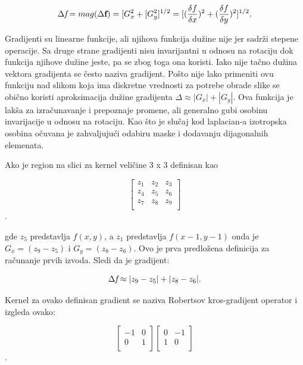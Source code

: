 \documentclass[a4paper,12pt,titlepage]{article}
\begin{document}
\begin{equation}\label{eq:grad12}
	\Delta \emph{f} = mag(\Delta \textbf{f}) = [G_{x}^{2} + [G_{y}^{2}]^{1/2} = [ (\dfrac{\delta f}{\delta x})^{2} +  (\dfrac{\delta f}{\delta y})^{2} ]^{1/2}. 
\end{equation}

Gradijenti su linearne funkcije, ali njihova funkcija dužine nije jer sadrži stepene operacije. Sa druge strane gradijenti nisu invarijantni u odnosu na rotaciju dok funkcija njihove dužine jeste, pa se zbog toga ona koristi. Iako nije tačno dužina vektora gradijenta se često naziva gradijent. Pošto nije lako primeniti ovu funkciju nad slikom koja ima diskretne vrednosti za potrebe obrade slike se obično koristi aproksimacija dužine gradijenta $\Delta \approx |G_{x}| + |G_{y}|$. Ova funkcija je lakša za izračunavanje i prepoznaje promene, ali generalno gubi osobinu invarijacije u odnosu na rotaciju. Kao što je slučaj kod laplacian-a izotropska osobina očuvana je zahvaljujući odabiru maske i dodavanju dijagonalnih elemenata. 

Ako je region na slici za kernel veličine 3 x 3 definisan kao

 \[
\begin{bmatrix}
     z_{1} & z_{2} & z_{3} \\
     z_{4} & z_{5} & z_{6} \\
     z_{7} & z_{8} & z_{9} \\
\end{bmatrix}
\].

gde $z_{5}$ predstavlja $f(x, y)$, a $z_{1}$ predstavlja $f(x - 1, y - 1)$ onda je $G_{x} = (z_{9} - z_{5})$ i $G_{y} = (z_{8} - z_{6})$. Ovo je prva predložena definicija za računanje prvih izvoda. Sledi da je gradijent:

\begin{equation}\label{eq:grad13}
\Delta \emph{f} \approx |z_{9} - z_{5}| + |z_{8} - z_{6}|.
\end{equation}

Kernel za ovako definisan gradient se naziva Robertsov kros-gradijent operator i izgleda ovako:

 \[
\begin{bmatrix}
     -1 & 0 \\
     0 & 1 \\
\end{bmatrix}
\begin{bmatrix}
     0 & -1 \\
     1 & 0 \\
\end{bmatrix}
\].
\end{document}
